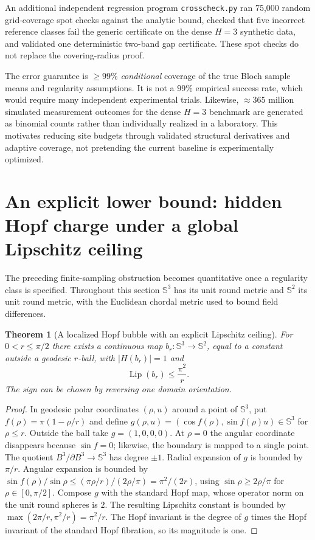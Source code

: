 \documentclass[aps,prd,onecolumn,notitlepage,11pt,superscriptaddress,longbibliography]{revtex4-2}
\newtheorem{theorem}{Theorem}
\newcommand{\Sph}{\mathbb S}
\begin{document}
An additional independent regression program \texttt{crosscheck.py} ran 75,000 random grid-coverage spot checks against the analytic bound, checked that five incorrect reference classes fail the generic certificate on the dense $H=3$ synthetic data, and validated one deterministic two-band gap certificate. These spot checks do not replace the covering-radius proof.\par\smallskip\noindent
The error guarantee is $\ge99\%$ \emph{conditional} coverage of the true Bloch sample means and regularity assumptions. It is not a $99\%$ empirical success rate, which would require many independent experimental trials. Likewise, $\approx365$ million simulated measurement outcomes for the dense $H=3$ benchmark are generated as binomial counts rather than individually realized in a laboratory. This motivates reducing site budgets through validated structural derivatives and adaptive coverage, not pretending the current baseline is experimentally optimized.

\section{An explicit lower bound: hidden Hopf charge under a global Lipschitz ceiling}
The preceding finite-sampling obstruction becomes quantitative once a
regularity class is specified. Throughout this section $\Sph^3$ has
its unit round metric and $\Sph^2$ its unit round metric, with the
Euclidean chordal metric used to bound field differences.

\begin{theorem}[A localized Hopf bubble with an explicit Lipschitz ceiling]\label{th:bubble}
For $0<r\le\pi/2$ there exists a continuous map
$b_r:\Sph^3\to\Sph^2$, equal to a constant outside a geodesic
$r$-ball, with $|H(b_r)|=1$ and
\begin{equation}\label{eq:bubble}
\operatorname{Lip}(b_r)\le\frac{\pi^2}{r}.
\end{equation}
The sign can be chosen by reversing one domain orientation.
\end{theorem}
\begin{proof}
In geodesic polar coordinates $(\rho,u)$ around a point of $\Sph^3$,
put $f(\rho)=\pi(1-\rho/r)$ and define
$g(\rho,u)=(\cos f(\rho),\sin f(\rho)u)\in\Sph^3$ for
$\rho\le r$. Outside the ball take $g=(1,0,0,0)$.
At $\rho=0$ the angular coordinate disappears because $\sin f=0$;
likewise, the boundary is mapped to a single point. The quotient
$B^3/\partial B^3\to\Sph^3$ has degree $\pm1$.
Radial expansion of $g$ is bounded by $\pi/r$.
Angular expansion is bounded by
$\sin f(\rho)/\sin\rho\le (\pi\rho/r)/(2\rho/\pi)
=\pi^2/(2r)$, using $\sin\rho\ge 2\rho/\pi$ for
$\rho\in[0,\pi/2]$. Compose $g$ with the standard Hopf map,
whose operator norm on the unit round spheres is $2$.
The resulting Lipschitz constant is bounded by
$\max(2\pi/r,\pi^2/r)=\pi^2/r$.
The Hopf invariant is the degree of $g$ times the Hopf invariant
of the standard Hopf fibration, so its magnitude is one.
\end{proof}
\end{document}
